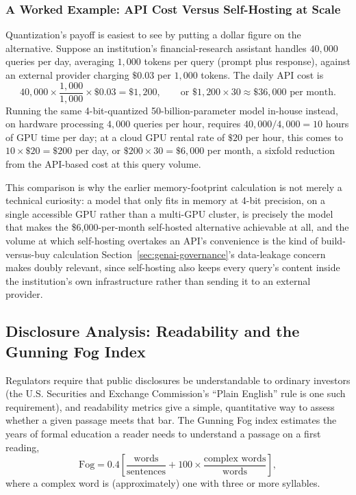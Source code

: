 \documentclass[../ai_in_finance]{subfiles}
\begin{document}
\subsubsection*{A Worked Example: API Cost Versus Self-Hosting at Scale}
Quantization's payoff is easiest to see by putting a dollar figure on the alternative. Suppose an institution's financial-research assistant handles $40{,}000$ queries per day, averaging $1{,}000$ tokens per query (prompt plus response), against an external provider charging $\$0.03$ per $1{,}000$ tokens. The daily API cost is
\begin{equation*}
40{,}000 \times \frac{1{,}000}{1{,}000} \times \$0.03 = \$1{,}200, \qquad \text{or } \$1{,}200 \times 30 \approx \$36{,}000 \text{ per month.}
\end{equation*}
Running the same 4-bit-quantized 50-billion-parameter model in-house instead, on hardware processing $4{,}000$ queries per hour, requires $40{,}000/4{,}000 = 10$ hours of GPU time per day; at a cloud GPU rental rate of $\$20$ per hour, this comes to $10 \times \$20 = \$200$ per day, or $\$200 \times 30 = \$6{,}000$ per month, a sixfold reduction from the API-based cost at this query volume.

This comparison is why the earlier memory-footprint calculation is not merely a technical curiosity: a model that only fits in memory at 4-bit precision, on a single accessible GPU rather than a multi-GPU cluster, is precisely the model that makes the \$6,000-per-month self-hosted alternative achievable at all, and the volume at which self-hosting overtakes an API's convenience is the kind of build-versus-buy calculation Section~\ref{sec:genai-governance}'s data-leakage concern makes doubly relevant, since self-hosting also keeps every query's content inside the institution's own infrastructure rather than sending it to an external provider.

\subsection{Disclosure Analysis: Readability and the Gunning Fog Index}
\label{sec:disclosure-analysis}

Regulators require that public disclosures be understandable to ordinary investors (the U.S. Securities and Exchange Commission's ``Plain English'' rule is one such requirement), and readability metrics give a simple, quantitative way to assess whether a given passage meets that bar. The Gunning Fog index estimates the years of formal education a reader needs to understand a passage on a first reading,
\begin{equation*}
\text{Fog} = 0.4 \left[ \frac{\text{words}}{\text{sentences}} + 100 \times \frac{\text{complex words}}{\text{words}} \right],
\end{equation*}
where a complex word is (approximately) one with three or more syllables.
\end{document}

